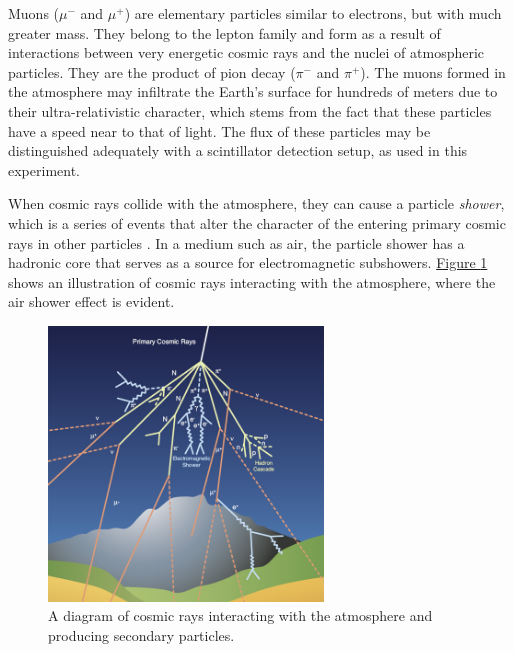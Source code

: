 \par
Muons ($\mu^{-}$ and $\mu^{+}$) are elementary particles similar to electrons, but with much greater mass. They belong to the lepton family \cite{klapdorkleingrothaus_2018_lepton} and form as a result of interactions between very energetic cosmic rays and the nuclei of atmospheric particles. They are the product of pion decay ($\pi^{-}$ and $\pi^{+}$). The muons formed in the atmosphere may infiltrate the Earth's surface for hundreds of meters due to their ultra-relativistic character, which stems from the fact that these particles have a speed near to that of light. The flux of these particles may be distinguished adequately with a scintillator detection setup, as used in this experiment.

\par
When cosmic rays collide with the atmosphere, they can cause a particle \textit{shower}, which is a series of events that alter the character of the entering primary cosmic rays in other particles \cite{bonomi_2020_applications}. In a medium such as air, the particle shower has a hadronic core that serves as a source for electromagnetic subshowers. \hyperref[figCosmicRay]{Figure \ref{figCosmicRay}} shows an illustration of cosmic rays interacting with the atmosphere, where the air shower effect is evident.

\begin{figure}[h!]
    \centering
    \includegraphics[width=0.65\textwidth]{Images/chap3/cosmic_ray.jpg}
    \caption{A diagram of cosmic rays interacting with the atmosphere and producing secondary particles. \cite{marzena_2017_cms}}
    \label{figCosmicRay}
\end{figure}


